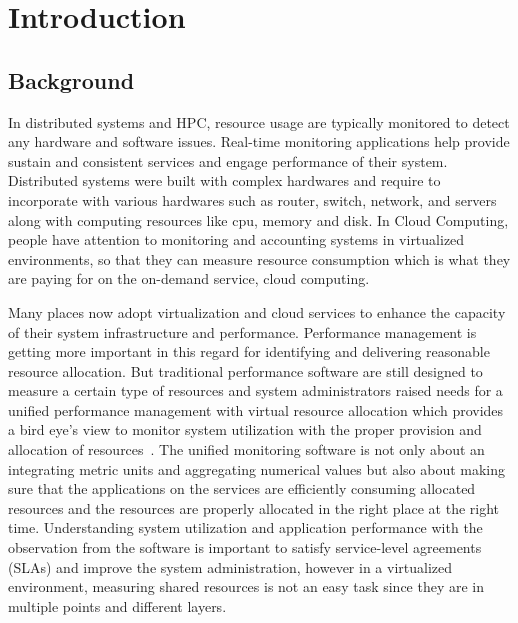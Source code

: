 \documentclass{sig-alternate}
\begin{document}
  
\section{Introduction} 

\subsection{Background}
In distributed systems and HPC, resource usage are typically monitored to detect any hardware and software issues. Real-time monitoring applications help provide sustain and consistent services and engage performance of their system. Distributed systems were built with complex hardwares and require to incorporate with various hardwares such as router, switch, network, and servers along with computing resources like cpu, memory and disk. In Cloud Computing, people have attention to monitoring and accounting systems in virtualized environments, so that they can measure resource consumption which is what they are paying for on the on-demand service, cloud computing. 

Many places now adopt virtualization and cloud services to enhance the capacity of their system infrastructure and performance. Performance management is getting more important in this regard for identifying and delivering reasonable resource allocation. But traditional performance software are still designed to measure a certain type of resources and system administrators raised needs for a unified performance management with virtual resource allocation which provides a bird eye's view to monitor system utilization with the proper provision and allocation of resources~\cite{Habibzai12}. The unified monitoring software is not only about an integrating metric units and aggregating numerical values but also about making sure that the applications on the services are efficiently consuming allocated resources and the resources are properly allocated in the right place at the right time. Understanding system utilization and application performance with the observation from the software is important to satisfy service-level agreements (SLAs) and improve the system administration, however in a virtualized environment, measuring shared resources is not an easy task since they are in multiple points and different layers. 

\iffalse
\end{document}
